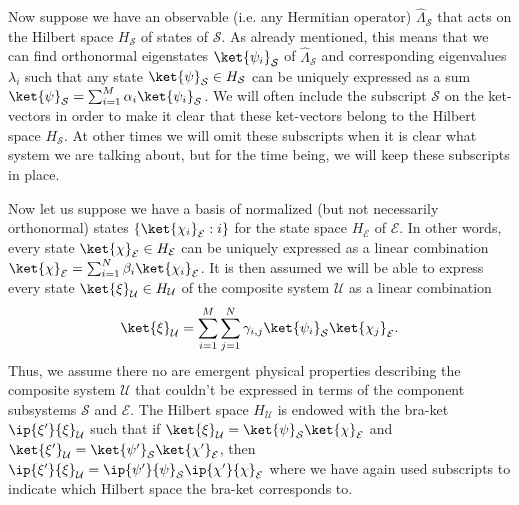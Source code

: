     Now suppose we have an observable (i.e. any Hermitian operator) $\hat{\Lambda}_{\mathcal{S}}$ that acts on the Hilbert space $H_\mathcal{S}$ of states of $\mathcal{S}$. As already mentioned, this means that we can find orthonormal eigenstates $\ket{\psi_i}_\mathcal{S}$ of $\hat{\Lambda}_{\mathcal{S}}$ and corresponding eigenvalues $\lambda_i$ such that any state $\ket{\psi}_\mathcal{S}\in H_\mathcal{S}$ can be uniquely expressed as a sum $\ket{\psi}_\mathcal{S}=\sum_{i=1}^M\alpha_i\ket{\psi_i}_\mathcal{S}$. We will often include the subscript $\mathcal{S}$ on the ket-vectors in order to make it clear that these ket-vectors belong to the Hilbert space $H_\mathcal{S}$. At other times we will omit these subscripts when it is clear what system we are talking about, but for the time being, we will keep these subscripts in place.
     
      Now let us suppose we have a basis of normalized (but not necessarily orthonormal) states $\{\ket{\chi_i}_\mathcal{E}:i\}$ for the state space $H_\mathcal{E}$ of $\mathcal{E}$. In other words, every state $\ket{\chi}_\mathcal{E}\in H_\mathcal{E}$ can be uniquely expressed as a linear combination $\ket{\chi}_\mathcal{E}=\sum_{i=1}^N\beta_i\ket{\chi_i}_\mathcal{E}$. It is then assumed we will be able to express every state $\ket{\xi}_\mathcal{U}\in H_\mathcal{U}$ of the composite system $\mathcal{U}$ as a linear combination
      \begin{equation}\label{entangled}\ket{\xi}_\mathcal{U}=\sum_{i=1}^M\sum_{j=1}^N\gamma_{i,j}\ket{\psi_i}_\mathcal{S}\ket{\chi_j}_\mathcal{E}.
      \end{equation}
      Thus, we assume there no are emergent physical properties describing the composite system $\mathcal{U}$ that couldn't be expressed in terms of the component subsystems $\mathcal{S}$ and $\mathcal{E}$. 
      The Hilbert space $H_\mathcal{U}$ is  endowed with the bra-ket $\ip{\xi'}{\xi}_\mathcal{U}$ such that if $\ket{\xi}_\mathcal{U}=\ket{\psi}_\mathcal{S}\ket{\chi}_\mathcal{E}$ and $\ket{\xi'}_\mathcal{U}=\ket{\psi'}_\mathcal{S}\ket{\chi'}_\mathcal{E}$, then $\ip{\xi'}{\xi}_\mathcal{U}=\ip{\psi'}{\psi}_\mathcal{S}\ip{\chi'}{\chi}_\mathcal{E}$ where we have again used subscripts to indicate which Hilbert space the bra-ket corresponds to. 
      
